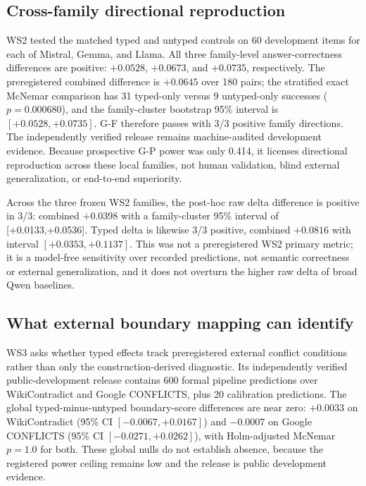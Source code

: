 \documentclass[letterpaper]{article}
\begin{document}
\subsection{Cross-family directional reproduction}

WS2 tested the matched typed and untyped controls on 60 development items for
each of Mistral, Gemma, and Llama. All three family-level answer-correctness
differences are positive: $+0.0528$, $+0.0673$, and $+0.0735$, respectively.
The preregistered combined difference is $+0.0645$ over 180 pairs; the
stratified exact McNemar comparison has 31 typed-only versus 9 untyped-only
successes ($p=0.000680$), and the family-cluster bootstrap 95\% interval is
$[+0.0528,+0.0735]$. G-F therefore passes with 3/3 positive family directions.
The independently verified release remains machine-audited development
evidence. Because prospective G-P power was only 0.414, it licenses
directional reproduction across these local families, not human validation,
blind external generalization, or end-to-end superiority.

Across the three frozen WS2 families, the post-hoc raw delta difference is positive in 3/3: combined +0.0398 with a family-cluster 95\% interval of [+0.0133,+0.0536]. Typed delta is likewise 3/3 positive, combined $+0.0816$ with interval $[+0.0353,+0.1137]$. This was not a preregistered WS2 primary metric; it is a model-free sensitivity over recorded predictions, not semantic correctness or external generalization, and it does not overturn the higher raw delta of broad Qwen baselines.

\subsection{What external boundary mapping can identify}

WS3 asks whether typed effects track preregistered external conflict conditions
rather than only the construction-derived diagnostic. Its independently
verified public-development release contains 600 formal pipeline predictions
over WikiContradict and Google CONFLICTS, plus 20 calibration predictions. The
global typed-minus-untyped boundary-score differences are near zero:
$+0.0033$ on WikiContradict (95\% CI $[-0.0067,+0.0167]$) and $-0.0007$ on
Google CONFLICTS (95\% CI $[-0.0271,+0.0262]$), with Holm-adjusted McNemar
$p=1.0$ for both. These global nulls do not establish absence, because the
registered power ceiling remains low and the release is public development
evidence.
\end{document}
